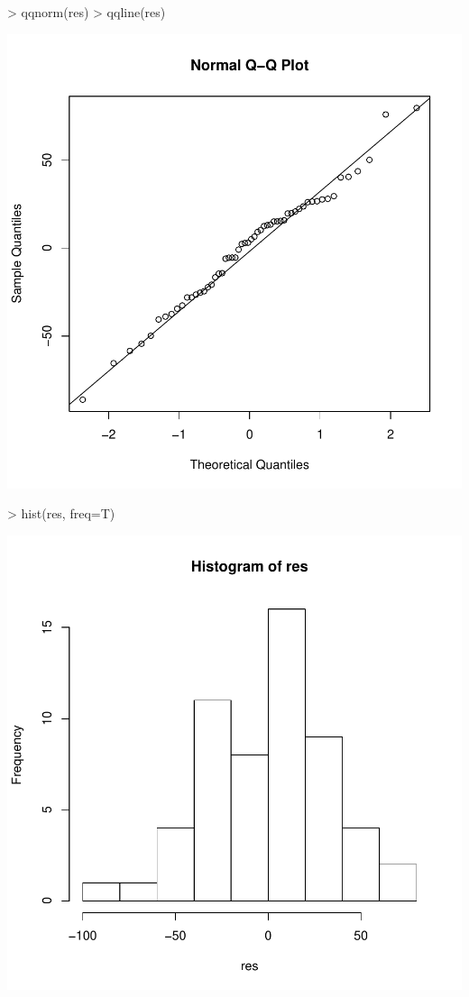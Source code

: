 \documentclass{article}
\begin{document}
\begin{Schunk}
\begin{Sinput}
> qqnorm(res)
> qqline(res)
\end{Sinput}
\end{Schunk}
\includegraphics{Assignment2b-012}
\begin{Schunk}
\begin{Sinput}
> hist(res, freq=T)
\end{Sinput}
\end{Schunk}
\includegraphics{Assignment2b-013}
\end{document}
